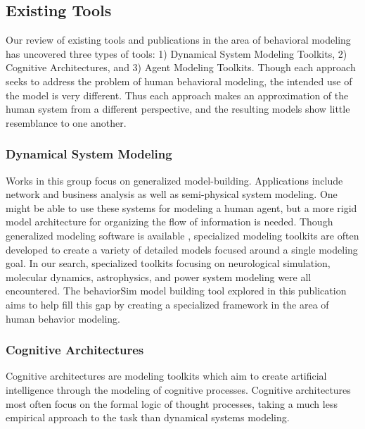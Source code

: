 \documentclass[conference]{IEEEtran}
\begin{document}
\subsection{Existing Tools}
Our review of existing tools and publications in the area of behavioral modeling has uncovered three types of tools: 1) Dynamical System Modeling Toolkits, 2) Cognitive Architectures, and 3) Agent Modeling Toolkits. 
Though each approach seeks to address the problem of human behavioral modeling, the intended use of the model is very different. 
Thus each approach makes an approximation of the human system from a different perspective, and the resulting models show little resemblance to one another.

\subsubsection{Dynamical System Modeling}
Works in this group focus on generalized model-building. 
Applications include network and business analysis as well as semi-physical system modeling. 
One might be able to use these systems for modeling a human agent, but a more rigid model architecture for organizing the flow of information is needed. 
Though generalized modeling software is available \cite{chen2013open, eberlein1992understanding, uhlig1995toolkit}, specialized modeling toolkits are often developed to create a variety of detailed models focused around a single modeling goal. 
In our search, specialized toolkits focusing on neurological simulation\cite{beim2009inverse}, molecular dynamics\cite{blinov2004bionetgen, le2001stochsim}, astrophysics\cite{mcmillan2011simulations}, and power system modeling\cite{nutaro2011designing} were all encountered. 
The behaviorSim model building tool explored in this publication aims to help fill this gap by creating a specialized framework in the area of human behavior modeling.

\subsubsection{Cognitive Architectures}
Cognitive architectures\cite{gluck2006modeling} are modeling toolkits which aim to create artificial intelligence through the modeling of cognitive processes. 
Cognitive architectures most often focus on the formal logic of thought processes, taking a much less empirical approach to the task than dynamical systems modeling.
\end{document}
